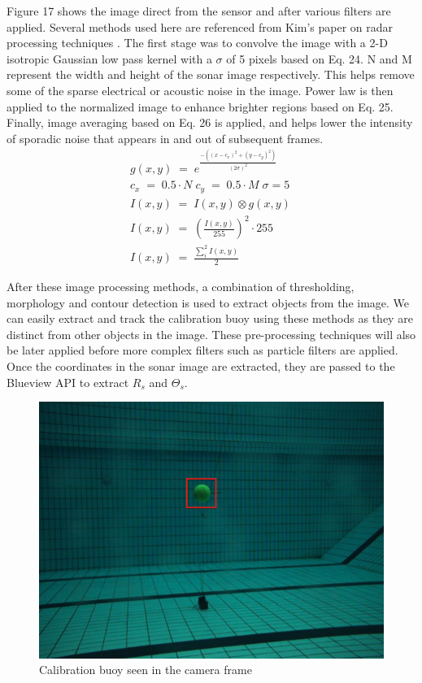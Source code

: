 \documentclass[15pt]{article}
\let\Theta\varTheta
\newcommand{\RSonar}{$\si{\textit{R}_{s}}$\xspace}
\newcommand{\ThetaSonar}{$\si{\Theta_{s}}$\xspace}
\begin{document}
Figure 17 shows the image direct from the sensor and after various filters are applied. Several methods used here are referenced from Kim's paper on radar processing techniques \cite{Kim2001}. The first stage was to convolve the image with a 2-D isotropic Gaussian low pass kernel with a $\sigma $ of 5 pixels based on Eq. 24. N and M represent the width and height of the sonar image respectively. This helps remove some of the sparse electrical or acoustic noise in the image. Power law is then applied to the normalized image to enhance brighter regions based on Eq. 25. Finally, image averaging based on Eq. 26 is applied, and helps lower the intensity of sporadic noise that appears in and out of subsequent frames. 
\begin{gather}
g\left( x,y \right)\; =\; e^{\frac{-\left( \left( x-c_{x} \right)^{2}+\left( y-c_{y} \right)^{2} \right)}{\left( 2\sigma  \right)^{2}}} \\
c_{x}\; =\; 0.5\cdot N\; c_{y}\; =\; 0.5\cdot M\; \sigma =5\; \nonumber\\
I\left( x,y \right)\; =\; I\left( x,y \right)\otimes g\left( x,y \right) \nonumber\\
I\left( x,y \right)\; =\; \left( \frac{I\left( x,y \right)}{255} \right)^{2}\cdot 255 \\
I\left( x,y \right)\; =\; \frac{\sum_{i}^{2}{I\left( x,y \right)}}{2}
\end{gather}

After these image processing methods, a combination of thresholding, morphology and contour detection is used to extract objects from the image. We can easily extract and track the calibration buoy using these methods as they are distinct from other objects in the image. These  pre-processing techniques will also be later applied before more complex filters such as particle filters are applied. Once the coordinates in the sonar image are extracted, they are passed to the Blueview API to extract \RSonar and \ThetaSonar.

\begin{figure}[h!]
  \centering
  \includegraphics[scale=0.3]{buoycamera}
  \captionsetup{justification=centering}
  \caption{Calibration buoy seen in the camera frame}
\end{figure}
\end{document}
